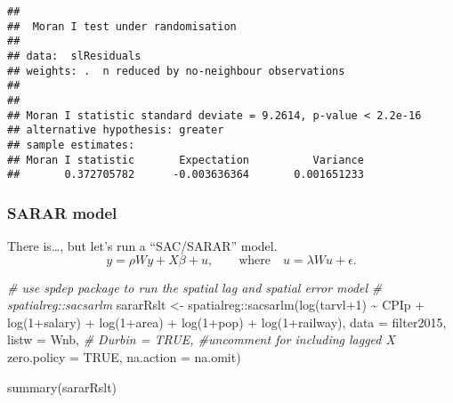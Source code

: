 \documentclass[
]{article}
\newenvironment{Shaded}{\begin{snugshade}}{\end{snugshade}}
\newcommand{\AttributeTok}[1]{\textcolor[rgb]{0.77,0.63,0.00}{#1}}
\newcommand{\CommentTok}[1]{\textcolor[rgb]{0.56,0.35,0.01}{\textit{#1}}}
\newcommand{\ConstantTok}[1]{\textcolor[rgb]{0.00,0.00,0.00}{#1}}
\newcommand{\DecValTok}[1]{\textcolor[rgb]{0.00,0.00,0.81}{#1}}
\newcommand{\FunctionTok}[1]{\textcolor[rgb]{0.00,0.00,0.00}{#1}}
\newcommand{\NormalTok}[1]{#1}
\newcommand{\OtherTok}[1]{\textcolor[rgb]{0.56,0.35,0.01}{#1}}
\newcommand{\SpecialCharTok}[1]{\textcolor[rgb]{0.00,0.00,0.00}{#1}}
\begin{document}
\begin{verbatim}
## 
##  Moran I test under randomisation
## 
## data:  slResiduals  
## weights: .  n reduced by no-neighbour observations
##   
## 
## Moran I statistic standard deviate = 9.2614, p-value < 2.2e-16
## alternative hypothesis: greater
## sample estimates:
## Moran I statistic       Expectation          Variance 
##       0.372705782      -0.003636364       0.001651233
\end{verbatim}

\hypertarget{sarar-model}{%
\subsubsection{SARAR model}\label{sarar-model}}

There is\ldots, but let's run a ``SAC/SARAR'' model.
\[y = \rho Wy + X\beta + u, \qquad\text{where}\quad u = \lambda Wu + \epsilon.\]

\begin{Shaded}
\begin{Highlighting}[]
\CommentTok{\# use spdep package to run the spatial lag and spatial error model }
\CommentTok{\# spatialreg::sacsarlm}
\NormalTok{sararRslt }\OtherTok{\textless{}{-}}\NormalTok{ spatialreg}\SpecialCharTok{::}\FunctionTok{sacsarlm}\NormalTok{(}\FunctionTok{log}\NormalTok{(tarvl}\SpecialCharTok{+}\DecValTok{1}\NormalTok{) }\SpecialCharTok{\textasciitilde{}}\NormalTok{ CPIp }\SpecialCharTok{+}
                \FunctionTok{log}\NormalTok{(}\DecValTok{1}\SpecialCharTok{+}\NormalTok{salary) }\SpecialCharTok{+}
                \FunctionTok{log}\NormalTok{(}\DecValTok{1}\SpecialCharTok{+}\NormalTok{area) }\SpecialCharTok{+} \FunctionTok{log}\NormalTok{(}\DecValTok{1}\SpecialCharTok{+}\NormalTok{pop) }\SpecialCharTok{+}
                \FunctionTok{log}\NormalTok{(}\DecValTok{1}\SpecialCharTok{+}\NormalTok{railway),}
              \AttributeTok{data =}\NormalTok{ filter2015,}
              \AttributeTok{listw =}\NormalTok{ Wnb,}
              \CommentTok{\# Durbin = TRUE, \#uncomment for including lagged X}
              \AttributeTok{zero.policy =} \ConstantTok{TRUE}\NormalTok{,}
              \AttributeTok{na.action =}\NormalTok{ na.omit)}

\FunctionTok{summary}\NormalTok{(sararRslt)}
\end{Highlighting}
\end{Shaded}
\end{document}
